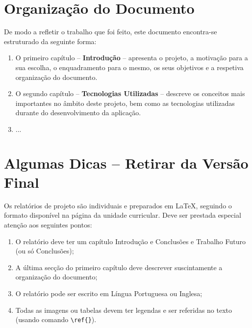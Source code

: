 \section{Organização do Documento}
\label{sec:organ}
De modo a refletir o trabalho que foi feito, este documento encontra-se estruturado da seguinte forma:
\begin{enumerate}
\item O primeiro capítulo -- \textbf{Introdução} -- apresenta o projeto, a motivação para a sua escolha, o enquadramento para o mesmo, os seus objetivos e a respetiva organização do documento.
\item O segundo capítulo -- \textbf{Tecnologias Utilizadas} -- descreve os conceitos mais importantes no âmbito deste projeto, bem como as tecnologias utilizadas durante do desenvolvimento da aplicação.
\item ...
\end{enumerate}

\section{Algumas Dicas -- Retirar da Versão Final}
Os relatórios de projeto são individuais e preparados em \LaTeX, seguindo o formato disponível na página da unidade curricular. Deve ser prestada especial atenção aos seguintes pontos:
\begin{enumerate}
  \item O relatório deve ter um capítulo Introdução e Conclusões e Trabalho Futuro (ou só Conclusões);
  \item A última secção do primeiro capítulo deve descrever suscintamente a organização do documento;
  \item O relatório pode ser escrito em Língua Portuguesa ou Inglesa;
  \item Todas as imagens ou tabelas devem ter legendas e ser referidas no texto (usando comando \texttt{\textbackslash ref\{\}}).
\end{enumerate}
